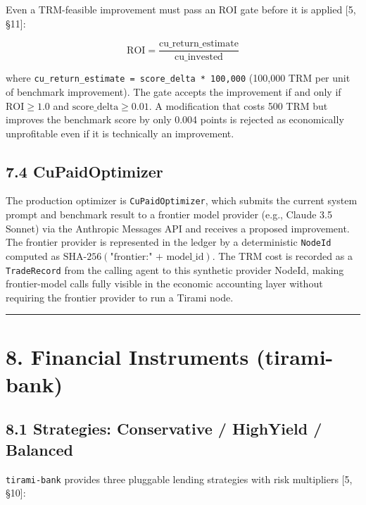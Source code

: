 \documentclass[
  11pt,
]{article}
\begin{document}
Even a TRM-feasible improvement must pass an ROI gate before it is
applied {[}5, §11{]}:

\[\text{ROI} = \frac{\text{cu\_return\_estimate}}{\text{cu\_invested}}\]

where \texttt{cu\_return\_estimate\ =\ score\_delta\ *\ 100,000}
(100,000 TRM per unit of benchmark improvement). The gate accepts the
improvement if and only if \(\text{ROI} \geq 1.0\) and
\(\text{score\_delta} \geq 0.01\). A modification that costs 500 TRM but
improves the benchmark score by only 0.004 points is rejected as
economically unprofitable even if it is technically an improvement.

\subsection{7.4 CuPaidOptimizer}\label{cupaidoptimizer}

The production optimizer is \texttt{CuPaidOptimizer}, which submits the
current system prompt and benchmark result to a frontier model provider
(e.g., Claude 3.5 Sonnet) via the Anthropic Messages API and receives a
proposed improvement. The frontier provider is represented in the ledger
by a deterministic \texttt{NodeId} computed as
\(\text{SHA-256}(\text{"frontier:" + model\_id})\). The TRM cost is
recorded as a \texttt{TradeRecord} from the calling agent to this
synthetic provider NodeId, making frontier-model calls fully visible in
the economic accounting layer without requiring the frontier provider to
run a Tirami node.

\begin{center}\rule{0.5\linewidth}{0.5pt}\end{center}

\section{8. Financial Instruments
(tirami-bank)}\label{financial-instruments-tirami-bank}

\subsection{8.1 Strategies: Conservative / HighYield /
Balanced}\label{strategies-conservative-highyield-balanced}

\texttt{tirami-bank} provides three pluggable lending strategies with
risk multipliers {[}5, §10{]}:
\end{document}
